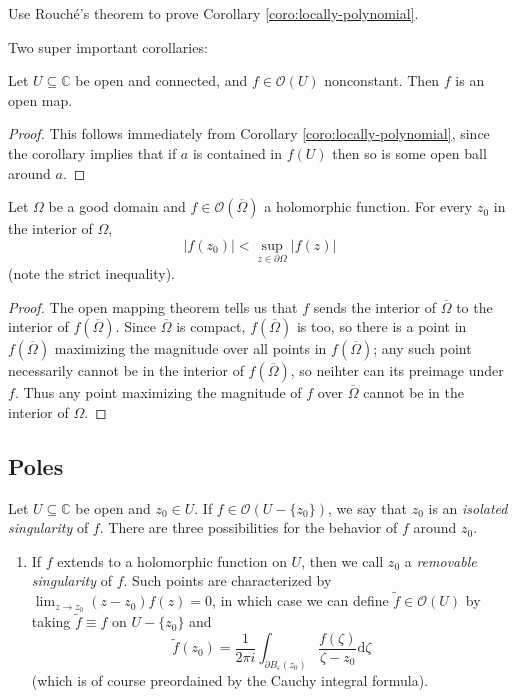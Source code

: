 \documentclass[10pt]{article}
\renewcommand{\tilde}{\widetilde}
\providecommand{\ol}{\overline}
\providecommand{\eps}{\varepsilon}
\providecommand{\dd}{\mathrm d}
\providecommand{\CC}{\mathbb C}
\providecommand{\ii}{\item}
\providecommand{\abs}[1]{\left\lvert{#1}\right\rvert}
\providecommand{\vocab}[1]{{{\sffamily\textit{#1}}}}
\begin{document}
\begin{exercise}
    \label{exer:locally-poly-rouche}
    Use Rouch\'e's theorem to prove Corollary \ref{coro:locally-polynomial}.
\end{exercise}

Two super important corollaries:
\begin{theorem}
    \label{thm:open-mapping}
    Let $U\subseteq\CC$ be open and connected,
    and $f\in\mathcal O(U)$ nonconstant.
    Then $f$ is an open map.
\end{theorem}

\begin{proof}
    This follows immediately from Corollary
    \ref{coro:locally-polynomial}, since the corollary implies that
    if $a$ is contained in $f(U)$ then so is some open ball around $a$.
\end{proof}

\pagebreak
\begin{theorem}
    \label{thm:max-mod-principle}
    Let $\Omega$ be a good domain
    and $f\in\mathcal O(\ol\Omega)$ a holomorphic function.
    For every $z_0$ in the interior of $\Omega$,
    \begin{equation*}
	\abs{f(z_0)} < \sup_{z\in\partial\Omega}\abs{f(z)}
    \end{equation*}
    (note the strict inequality).
\end{theorem}

\begin{proof}
    The open mapping theorem tells us that
    $f$ sends the interior of $\ol\Omega$
    to the interior of $f(\ol\Omega)$.
    Since $\ol\Omega$ is compact,
    $f(\ol\Omega)$ is too, so there is a point in $f(\ol\Omega)$
    maximizing the magnitude over all points in $f(\ol\Omega)$;
    any such point necessarily cannot be in the interior of $f(\ol\Omega)$,
    so neihter can its preimage under $f$.
    Thus any point maximizing the magnitude of $f$
    over $\ol\Omega$ cannot be in the interior of $\Omega$.
\end{proof}

\subsection{Poles}
Let $U\subseteq\CC$ be open and $z_0\in U$.
If $f\in\mathcal O(U - \{z_0\})$, we say that $z_0$ is
an \vocab{isolated singularity} of $f$.
There are three possibilities for the behavior of $f$ around $z_0$.
\begin{enumerate}[(1)]
    \ii If $f$ extends to a holomorphic function on $U$,
    then we call $z_0$ a \vocab{removable singularity} of $f$.
    Such points are characterized by
    $\lim_{z\to z_0}(z-z_0)f(z) = 0$, in which case
    we can define $\tilde f\in\mathcal O(U)$ by taking
    $\tilde f\equiv f$ on $U - \{z_0\}$ and
    \begin{equation*}
	\tilde f(z_0) = \frac 1{2\pi i}\int_{\partial B_\eps(z_0)}
	\frac{f(\zeta)}{\zeta-z_0}\dd\zeta
    \end{equation*}
    (which is of course preordained by the Cauchy integral formula).
\end{enumerate}
\end{document}
